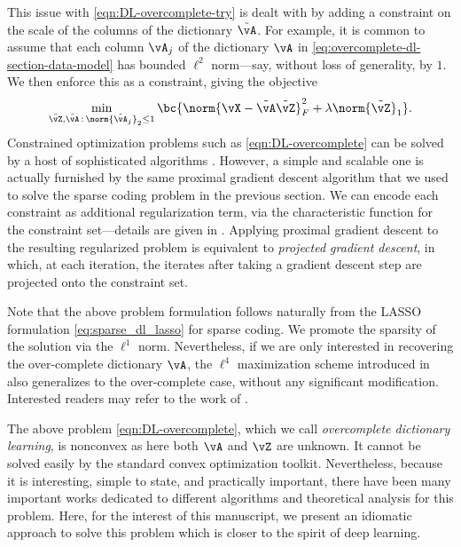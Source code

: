 \documentclass[../../book-main.tex]{subfiles}
\begin{document}
    This issue with \eqref{eqn:DL-overcomplete-try} is dealt with by adding
    a constraint on the scale of the columns of the dictionary $\tilde{\vA}$.
    For example, it is common to assume that each column $\vA_j$ of
    the dictionary
    $\vA$ in \eqref{eq:overcomplete-dl-section-data-model} has bounded $\ell^2$
    norm---say, without loss of generality, by $1$.
    We then enforce this as a constraint, giving the objective
    \begin{equation}
        \min_{\tilde{\vZ}, \tilde{\vA} \,:\, \norm{\tilde{\vA}_j}_2 \leq 1}
        \bc{\norm{\vX - \tilde{\vA}\tilde{\vZ}}_{F}^{2} + \lambda
        \norm{\tilde{\vZ}}_{1}}.
        \label{eqn:DL-overcomplete}
    \end{equation}
    Constrained optimization problems such as \eqref{eqn:DL-overcomplete}
    can be solved by a host of sophisticated algorithms
    \cite{nocedal2006numerical}. However, a simple and scalable one is actually
    furnished by the same proximal gradient descent algorithm that we
    used to solve
    the sparse coding problem in the previous section.
    We can encode each constraint as additional regularization term, via the
    characteristic function for the constraint set---details are given in
    .
    Applying proximal gradient descent to the resulting regularized problem is
    equivalent to \textit{projected gradient descent}, in which, at
    each iteration,
    the iterates after taking a gradient descent step are projected onto the
    constraint set.

    \begin{remark}
        Note that the above problem formulation follows naturally from the LASSO
        formulation \eqref{eq:sparse_dl_lasso} for sparse coding. We promote the
        sparsity of the solution via the \(\ell^1\) norm.
        Nevertheless, if we are only interested in recovering the
        over-complete dictionary \(\vA\), the \(\ell^4\) maximization
        scheme introduced in  also
        generalizes to the over-complete case, without any
        significant modification. Interested readers may refer to the
        work of \cite{Qu2020Geometric}.
    \end{remark}

    The above problem \eqref{eqn:DL-overcomplete}, which we call
    \textit{overcomplete dictionary learning}, is nonconvex as here
    both \(\vA\) and
    \(\vZ\) are unknown. It cannot be solved easily by the standard convex
    optimization toolkit. Nevertheless, because it is interesting,
    simple to state,
    and practically important, there have been many important works dedicated to
    different algorithms and theoretical analysis for this problem.
    Here, for the
    interest of this manuscript, we present an idiomatic approach to
    solve this problem
    which is closer to the spirit of deep learning.
\end{document}
